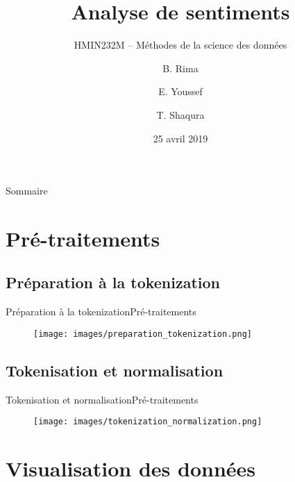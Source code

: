 \documentclass[usenames,dvipsnames]{beamer}
\title{Analyse de sentiments}
\subtitle{HMIN232M -- Méthodes de la science des données}
\author{B. Rima \and E. Youssef \and T. Shaqura}
\institute[UM]{M1 Informatique AIGLE}
\date{25 avril 2019}
\begin{document}
\begin{frame}
\titlepage
\end{frame}
\begin{frame}{Sommaire}
\tableofcontents
\end{frame}
\section{Pré-traitements}
\subsection{Préparation à la tokenization}
\begin{frame}{Préparation à la tokenization}{Pré-traitements}
\begin{figure}[!ht]
  \centering
  \texttt{[image: images/preparation\_tokenization.png]}
\end{figure}
\end{frame}

\subsection{Tokenisation et normalisation}
\begin{frame}{Tokenisation et normalisation}{Pré-traitements}
\begin{figure}[!ht]
  \centering
  \texttt{[image: images/tokenization\_normalization.png]}
\end{figure}
\end{frame}

\section{Visualisation des données}
\end{document}
